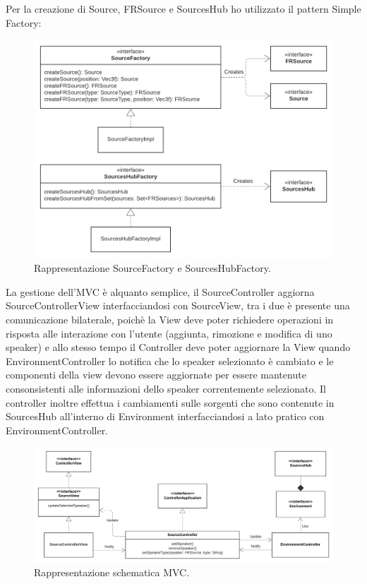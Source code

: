 \documentclass[a4paper,12pt]{report}
\begin{document}
Per la creazione di Source, FRSource e SourcesHub ho utilizzato il pattern Simple Factory:
%
\begin{figure}[H]
\centering{}
\includegraphics[width=\textwidth]{img/source/Factory.png}
\caption{Rappresentazione SourceFactory e SourcesHubFactory.}
\label{img:factory}
\end{figure}

La gestione dell'MVC è alquanto semplice, il SourceController aggiorna SourceControllerView interfacciandosi con SourceView, tra i due è presente una comunicazione bilaterale, poichè la View deve poter richiedere operazioni in risposta alle interazione con l'utente (aggiunta, rimozione e modifica di uno speaker) e allo stesso tempo il Controller deve poter aggiornare la View quando EnvironmentController lo notifica che lo speaker selezionato è cambiato e le componenti della view devono essere aggiornate per essere mantenute consonsistenti alle informazioni dello speaker correntemente selezionato.
Il controller inoltre effettua i cambiamenti sulle sorgenti che sono contenute in SourcesHub all'interno di Environment interfacciandosi a lato pratico con EnvironmentController.
%
\begin{figure}[H]
\centering{}
\includegraphics[width=\textwidth]{img/source/SourcesMVC.png}
\caption{Rappresentazione schematica MVC.}
\label{img:sourcesMVC}
\end{figure}
\end{document}
